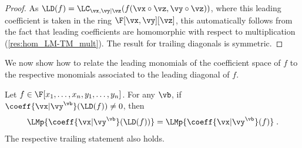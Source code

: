 \documentclass{toc}
\begin{document}
\begin{proof}
        As $\LD(f)=\LC_{\vx,\vy|\vz}(f(\vx\circ\vz,\vy\circ\vz))$, where this leading coefficient is taken in the ring $\F[\vx,\vy][\vz]$, this automatically follows from the fact that leading coefficients are homomorphic with respect to multiplication (\autoref{res:hom_LM-TM_mult}).  The result for trailing diagonals is symmetric.
\end{proof}

We now show how to relate the leading monomials of the coefficient space of $f$ to the respective monomials associated to the leading diagonal of $f$.

\begin{proposition}\label{res:diagonal:tm}
        Let $f\in\F[x_1,\ldots,x_n,y_1,\ldots,y_n]$.  For any $\vb$, if $\coeff{\vx|\vy^\vb}(\LD(f))\ne 0$, then
        \[
                \LMp{\coeff{\vx|\vy^\vb}(\LD(f))}=\LMp{\coeff{\vx|\vy^\vb}(f)}
                \;.
        \]
        The respective trailing statement also holds.
\end{proposition}
\end{document}
